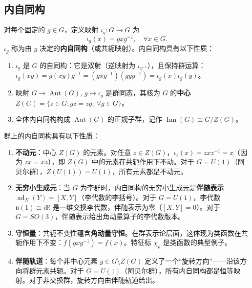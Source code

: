 \subsection{\texorpdfstring{内自同构}{内自同构}}
\label{subsec:inner_automorphism}

\begin{definition}[内自同构]\label{def:group_rotation_operation}
对每个固定的 $g \in G$，定义映射 $\iota_g: G \to G$ 为
\[
\iota_g(x) = g x g^{-1}, \quad \forall x \in G.
\]
$\iota_g$ 称为由 $g$ 决定的\textbf{内自同构}（或共轭映射）。内自同构具有以下性质：
\begin{enumerate}[label=(\roman*)]
    \item $\iota_g$ 是 $G$ 的自同构：它是双射（逆映射为 $\iota_{g^{-1}}$），且保持群运算：$\iota_g(xy) = g(xy)g^{-1} = (gxg^{-1})(gyg^{-1}) = \iota_g(x)\iota_g(y)$。
    \item 映射 $G \to \operatorname{Aut}(G)$, $g \mapsto \iota_g$ 是群同态，其核为 $G$ 的\textbf{中心} $Z(G) = \{z \in G : gz = zg,\ \forall g \in G\}$。
    \item 全体内自同构构成 $\operatorname{Aut}(G)$ 的正规子群，记作 $\operatorname{Inn}(G) \cong G/Z(G)$。
\end{enumerate}
\end{definition}

\begin{proposition}[内自同构的基本性质]\label{prop:rotation_operator}
群上的内自同构具有以下性质：
\begin{enumerate}[label=(\roman*)]
    \item \textbf{不动元}：中心 $Z(G)$ 的元素。对任意 $z \in Z(G)$，$\iota_z(x) = zxz^{-1} = x$（因为 $zx = xz$），即 $Z(G)$ 中的元素在共轭作用下不动。对于 $G = U(1)$（阿贝尔群），$Z(U(1)) = U(1)$，所有元素都是不动元。
    \item \textbf{无穷小生成元}：当 $G$ 为李群时，内自同构的无穷小生成元是\textbf{伴随表示} $\operatorname{ad}_X(Y) = [X,Y]$（李代数的李括号）。对于 $G = U(1)$，李代数 $\mathfrak{u}(1) \cong i\mathbb{R}$ 是一维交换李代数，伴随表示为零（$[X,Y]=0$）。对于 $G = SO(3)$，伴随表示给出角动量算子的李代数版本。
    \item \textbf{守恒量}：共轭不变性蕴含\textbf{角动量守恒}。在群表示论层面，这体现为类函数在共轭作用下不变：$f(gxg^{-1}) = f(x)$。特征标 $\chi_\rho$ 是类函数的典型例子。
    \item \textbf{伴随轨道}：每个非中心元素 $g \in G \setminus Z(G)$ 定义了一个“旋转方向”——沿该方向将群元素共轭。对于 $G = U(1)$（阿贝尔群），所有内自同构都是恒等映射。对于非交换群，旋转方向由伴随轨道给出。
\end{enumerate}
\end{proposition}

